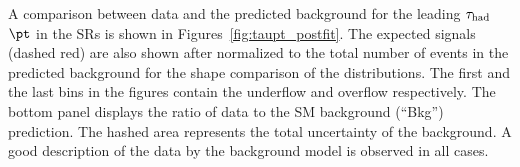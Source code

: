 A comparison between data and the predicted background for the leading $\tau_{\mathrm{had}}$ $\pt$ in the SRs 
is shown in Figures~\ref{fig:taupt_postfit}.
The expected signals (dashed red) are also shown after normalized to the total number of events in the predicted
background for the shape comparison of the distributions.   
The first and the last bins in the figures contain the underflow and overflow respectively.
The bottom panel displays the ratio of data to the SM background (``Bkg'') prediction.
The hashed area represents the total uncertainty of the background.
A good description of the data by the background model is observed in all cases.

